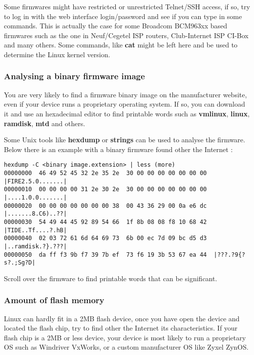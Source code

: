 Some firmwares might have restricted or unrestricted Telnet/SSH access, if so, try to log in with the web interface login/password and see if you can type in some commands. This is actually the case for some Broadcom BCM963xx based firmwares such as the one in Neuf/Cegetel ISP routers, Club-Internet ISP CI-Box and many others. Some commands, like \textbf{cat} might be left here and be used to determine the Linux kernel version.

\subsubsection{Analysing a binary firmware image}

You are very likely to find a firmware binary image on the manufacturer website, even if your device runs a proprietary operating system. If so, you can download it and use an hexadecimal editor to find printable words such as \textbf{vmlinux}, \textbf{linux}, \textbf{ramdisk}, \textbf{mtd} and others.

Some Unix tools like \textbf{hexdump} or \textbf{strings} can be used to analyse the firmware. Below there is an example with a binary firmware found other the Internet :

\begin{verbatim}
hexdump -C <binary image.extension> | less (more)
00000000  46 49 52 45 32 2e 35 2e  30 00 00 00 00 00 00 00  |FIRE2.5.0.......|
00000010  00 00 00 00 31 2e 30 2e  30 00 00 00 00 00 00 00  |....1.0.0.......|
00000020  00 00 00 00 00 00 00 38  00 43 36 29 00 0a e6 dc  |.......8.C6)..??|
00000030  54 49 44 45 92 89 54 66  1f 8b 08 08 f8 10 68 42  |TIDE..Tf....?.hB|
00000040  02 03 72 61 6d 64 69 73  6b 00 ec 7d 09 bc d5 d3  |..ramdisk.?}.???|
00000050  da ff f3 9b f7 39 7b ef  73 f6 19 3b 53 67 ea 44  |???.?9{?s?.;Sg?D|
\end{verbatim}

Scroll over the firmware to find printable words that can be significant.

\subsubsection{Amount of flash memory}

Linux can hardly fit in a 2MB flash device, once you have open the device and located the flash chip, try to find other the Internet its characteristics. If your flash chip is a 2MB or less device, your device is most likely to run a proprietary OS such as Windriver VxWorks, or a custom manufacturer OS like Zyxel ZynOS.

